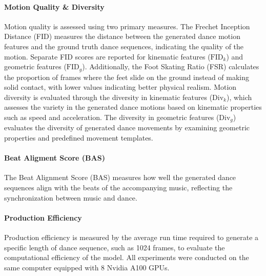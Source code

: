 \paragraph{Motion Quality \& Diversity}
Motion quality is assessed using two primary measures. The Frechet Inception Distance (FID) measures the distance between the generated dance motion features and the ground truth dance sequences, indicating the quality of the motion. Separate FID scores are reported for kinematic features ($\mathrm{FID}_k$) and geometric features ($\mathrm{FID}_g$). Additionally, the Foot Skating Ratio (FSR) calculates the proportion of frames where the feet slide on the ground instead of making solid contact, with lower values indicating better physical realism. Motion diversity is evaluated through the diversity in kinematic features (Div$_k$), which assesses the variety in the generated dance motions based on kinematic properties such as speed and acceleration. The diversity in geometric features (Div$_g$) evaluates the diversity of generated dance movements by examining geometric properties and predefined movement templates.



\paragraph{Beat Aligment Score (BAS)}
The Beat Alignment Score (BAS) measures how well the generated dance sequences align with the beats of the accompanying music, reflecting the synchronization between music and dance.

\paragraph{Production Efficiency}
Production efficiency is measured by the average run time required to generate a specific length of dance sequence, such as 1024 frames, to evaluate the computational efficiency of the model. All experiments were conducted on the same computer equipped with 8 Nvidia A100 GPUs.



